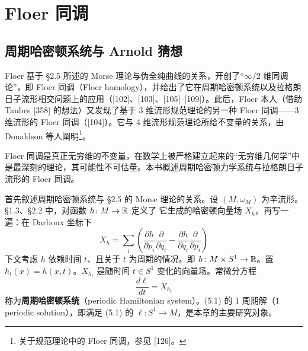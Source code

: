 \chapter{Floer 同调}

\section{周期哈密顿系统与 Arnold 猜想}


Floer 基于 §2.5 所述的 Morse 理论与伪全纯曲线的关系，开创了“$\infty/2$ 维同调论”，即 Floer 同调（Floer homology），并给出了它在周期哈密顿系统以及拉格朗日子流形相交问题上的应用（[102]、[103]、[105]–[109]）。此后，Floer 本人（借助 Taubes [358] 的想法）又发现了基于 3 维流形规范理论的另一种 Floer 同调——3 维流形的 Floer 同调（[104]）。它与 4 维流形规范理论所给不变量的关系，由 Donaldson 等人阐明\footnote{关于规范理论中的 Floer 同调，参见 [126]。}。

Floer 同调是真正无穷维的不变量，在数学上被严格建立起来的“无穷维几何学”中是最深刻的理论，其可能性不可估量。本书概述周期哈密顿力学系统与拉格朗日子流形的 Floer 同调。


首先叙述周期哈密顿系统与 §2.5 的 Morse 理论的关系。设 $(M,\omega_M)$ 为辛流形。§1.3、§2.2 中，对函数 $h\colon M\to\mathbb{R}$ 定义了
它生成的哈密顿向量场 $X_h$。再写一遍：在 Darboux 坐标下
\[
  X_h=\sum_i\left(\frac{\partial h}{\partial p_i}\frac{\partial}{\partial q_i}-\frac{\partial h}{\partial q_i}\frac{\partial}{\partial p_i}\right)
\]
下文考虑 $h$ 依赖时间 $t$、且关于 $t$ 为周期的情况。即 $h\colon M\times S^1\to\mathbb{R}$。置 $h_t(x)=h(x,t)$。$X_{h_t}$ 是随时间 $t\in S^1$ 变化的向量场。常微分方程
\begin{equation}
  \frac{d\ell}{dt}=X_{h_t} \tag{5.1}
\end{equation}
称为\textbf{周期哈密顿系统}（periodic Hamiltonian system）。(5.1) 的 1 周期解（1 periodic solution），即满足 (5.1) 的 $\ell\colon S^1\to M$，是本章的主要研究对象。

